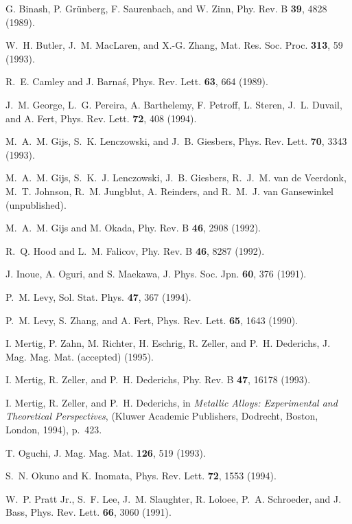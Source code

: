 {\begin{thebibliography}{m}
G. Binash, P. Gr{\"u}nberg, F. Saurenbach, and W. Zinn, Phy. Rev. B {\bf 39},
  4828  (1989).

W.~H. Butler, J.~M. MacLaren, and X.-G. Zhang, Mat. Res. Soc. Proc. {\bf 313},
  59  (1993).

R.~E. Camley and J. Barna\'{s}, Phys. Rev. Lett. {\bf 63},  664  (1989).

J.~M. George, L.~G. Pereira, A. Barthelemy, F. Petroff, L. Steren, J.~L.
  Duvail, and A. Fert, Phys. Rev. Lett. {\bf 72},  408  (1994).

M.~A.~M. Gijs, S.~K. Lenczowski, and J.~B. Giesbers, Phys. Rev. Lett. {\bf 70},
   3343  (1993).

M.~A.~M. Gijs, S.~K.~J. Lenczowski, J.~B. Giesbers, R.~J.~M. {van de Veerdonk},
  M.~T. Johnson, R.~M. Jungblut, A. Reinders, and R.~M.~J. {van Gansewinkel}
  (unpublished).

M.~A.~M. Gijs and M. Okada, Phy. Rev. B {\bf 46},  2908  (1992).

R.~Q. Hood and L.~M. Falicov, Phy. Rev. B {\bf 46},  8287  (1992).

J. Inoue, A. Oguri, and S. Maekawa, J. Phys. Soc. Jpn. {\bf 60},  376  (1991).

P.~M. Levy, Sol. Stat. Phys. {\bf 47},  367  (1994).

P.~M. Levy, S. Zhang, and A. Fert, Phys. Rev. Lett. {\bf 65},  1643  (1990).

I. Mertig, P. Zahn, M. Richter, H. Eschrig, R. Zeller, and P.~H. Dederichs, J.
  Mag. Mag. Mat.  (accepted)  (1995).

I. Mertig, R. Zeller, and P.~H. Dederichs, Phy. Rev. B {\bf 47},  16178
  (1993).

I. Mertig, R. Zeller, and P.~H. Dederichs,  in {\em Metallic Alloys:
  Experimental and Theoretical Perspectives},  (Kluwer Academic Publishers,
  Dodrecht, Boston, London, 1994), p.\ 423.

T. Oguchi, J. Mag. Mag. Mat. {\bf 126},  519  (1993).

S.~N. Okuno and K. Inomata, Phys. Rev. Lett. {\bf 72},  1553  (1994).

W.~P. {Pratt Jr.}, S.~F. Lee, J.~M. Slaughter, R. Loloee, P.~A. Schroeder, and
  J. Bass, Phys. Rev. Lett. {\bf 66},  3060  (1991).


\end{thebibliography}}
